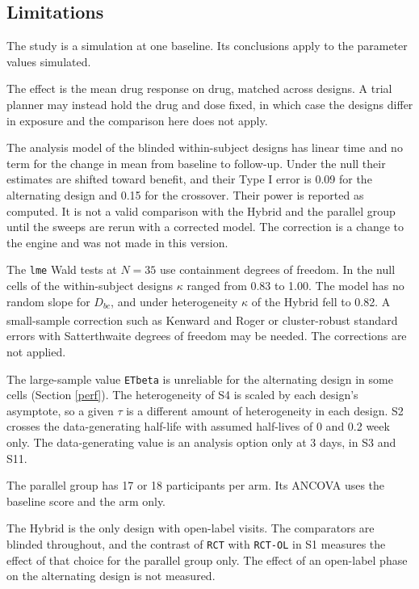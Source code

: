 \documentclass[
  11pt,
]{article}
\begin{document}
\subsection{Limitations}\label{limitations}

The study is a simulation at one baseline. Its conclusions apply to the parameter values simulated.

The effect is the mean drug response on drug, matched across designs. A trial planner may instead hold the drug and dose fixed, in which case the designs differ in exposure and the comparison here does not apply.

The analysis model of the blinded within-subject designs has linear time and no term for the change in mean from baseline to follow-up. Under the null their estimates are shifted toward benefit, and their Type I error is 0.09 for the alternating design and 0.15 for the crossover. Their power is reported as computed. It is not a valid comparison with the Hybrid and the parallel group until the sweeps are rerun with a corrected model. The correction is a change to the engine and was not made in this version.

The \texttt{lme} Wald tests at \(N = 35\) use containment degrees of freedom. In the null cells of the within-subject designs \(\kappa\) ranged from 0.83 to 1.00. The model has no random slope for \(D_{bc}\), and under heterogeneity \(\kappa\) of the Hybrid fell to 0.82. A small-sample correction such as Kenward and Roger\textsuperscript{} or cluster-robust standard errors with Satterthwaite degrees of freedom may be needed. The corrections are not applied.

The large-sample value \texttt{ETbeta} is unreliable for the alternating design in some cells (Section \ref{perf}). The heterogeneity of S4 is scaled by each design's asymptote, so a given \(\tau\) is a different amount of heterogeneity in each design. S2 crosses the data-generating half-life with assumed half-lives of 0 and 0.2 week only. The data-generating value is an analysis option only at 3 days, in S3 and S11.

The parallel group has 17 or 18 participants per arm. Its ANCOVA uses the baseline score and the arm only.

The Hybrid is the only design with open-label visits. The comparators are blinded throughout, and the contrast of \texttt{RCT} with \texttt{RCT-OL} in S1 measures the effect of that choice for the parallel group only. The effect of an open-label phase on the alternating design is not measured.
\end{document}
